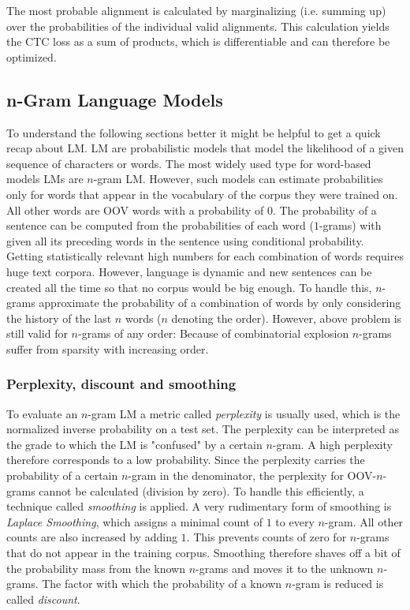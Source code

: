 The most probable alignment is calculated by marginalizing (i.e. summing up) over the probabilities of the individual valid alignments. This calculation yields the CTC loss as a sum of products, which is differentiable and can therefore be optimized.

\subsection{n-Gram Language Models}\label{n-gram-summary}

To understand the following sections better it might be helpful to get a quick recap about \ac{LM}. \ac{LM} are probabilistic models that model the likelihood of a given sequence of characters or words. The most widely used type for word-based models \ac{LM}s are $n$-gram \ac{LM}. However, such models can estimate probabilities only for words that appear in the vocabulary of the corpus they were trained on. All other words are \ac{OOV} words with a probability of $0$. The probability of a sentence can be computed from the probabilities of each word ($1$-grams) with given all its preceding words in the sentence using conditional probability. Getting statistically relevant high numbers for each combination of words requires huge text corpora. However, language is dynamic and new sentences can be created all the time so that no corpus would be big enough. To handle this, $n$-grams approximate the probability of a combination of words by only considering the history of the last $n$ words ($n$ denoting the order). However, above problem is still valid for $n$-grams of any order: Because of combinatorial explosion $n$-grams suffer from sparsity with increasing order. 

\subsubsection{Perplexity, discount and smoothing}

To evaluate an $n$-gram \ac{LM} a metric called \textit{perplexity} is usually used, which is the normalized inverse probability on a test set. The perplexity can be interpreted as the grade to which the \ac{LM} is "confused" by a certain $n$-gram. A high perplexity therefore corresponds to a low probability. Since the perplexity carries the probability of a certain $n$-gram in the denominator, the perplexity for \ac{OOV}-$n$-grams cannot be calculated (division by zero). To handle this efficiently, a technique called \textit{smoothing} is applied. A very rudimentary form of smoothing is \textit{Laplace Smoothing}, which assigns a minimal count of $1$ to every $n$-gram. All other counts are also increased by adding $1$. This prevents counts of zero for $n$-grams that do not appear in the training corpus. Smoothing therefore shaves off a bit of the probability mass from the known $n$-grams and moves it to the unknown $n$-grams. The factor with which the probability of a known $n$-gram is reduced is called \textit{discount}. 

